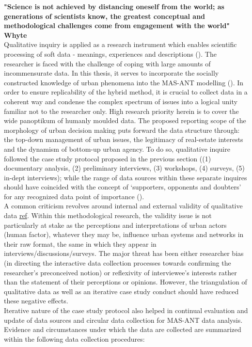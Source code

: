 \documentclass[11pt]{report}
\begin{document}
\textbf{"Science is not achieved  by distancing oneself from  the world; as  generations of scientists  know,  the greatest conceptual and methodological challenges come from  engagement with the world" Whyte}
\\
Qualitative inquiry is applied as a research instrument which enables scientific processing of soft data - meanings, experiences and descriptions (\cite{(Yin, 1994)}). The researcher is faced with the challenge of coping with large amounts of incommensurate data. In this thesis, it serves to incorporate the socially constructed knowledge of urban phenomena into the MAS-ANT modelling (\cite{(Mertens 1998, Flick 2002, Grubovic)}).
In order to ensure replicability of the hybrid method, it is crucial to collect data in a coherent way and condense the complex spectrum of issues into a logical unity familiar not to the researcher only. High research priority herein is to cover the wide panoptikum of humanly moulded data. The proposed reporting scope of the morphology of urban decision making puts forward the data structure through: the top-down management of urban issues, the legitimacy of real-estate interests and the dynamism of bottom-up urban agency. To do so, qualitative inquire followed the case study protocol proposed in the previous section ((1) documentary analysis, (2) preliminary interviews, (3) workshops, (4) surveys, (5) in-dept interviews); while the range of data sources within these separate inquires should have coincided with the concept of ‘supporters, opponents and doubters’ for any recognized data point of importance (\cite{(Pettigrew XXXX, Harrison 2002)}). 
\\
A common criticism revolves around internal and external validity of qualitative data \href{}{ref}. Within this methodological research, the validity issue is not particularly at stake as the perceptions and interpretations of urban actors (human factor), whatever they may be, influence urban systems and networks in their raw format, the same in which they appear in interviews/discussions/surveys. The major threat has been either researcher bias (in directing the interactive data collection processes towards confirming the researcher's preconceived notion) or reflexivity of interviewee's interests rather than the statement of their perceptions or opinions. However, the triangulation of qualitative data as well as an iterative case study conduct should have reduced these negative effects.
\\
Iterative nature of the case study protocol also helped in continual evaluation and update of data sources and circular data collection for MAS-ANT data analysis. Evidence and circumstances under which the data are collected are summarized within the following data collection procedures: 
\end{document}
